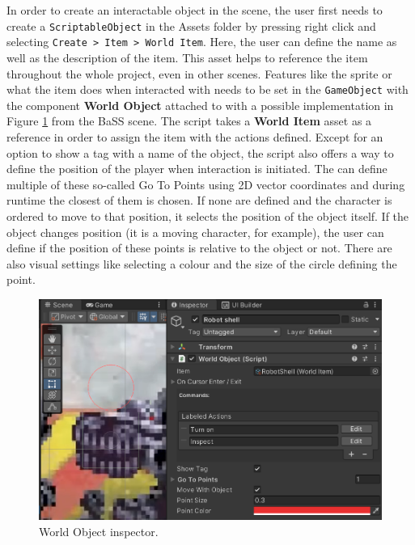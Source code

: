 In order to create an interactable object in the scene, the user first needs to create a \verb|ScriptableObject| in the Assets folder by pressing right click and selecting \verb|Create > Item > World Item|. Here, the user can define the name as well as the description of the item. This asset helps to reference the item throughout the whole project, even in other scenes. Features like the sprite or what the item does when interacted with needs to be set in the \verb|GameObject| with the component \textbf{World Object} attached to with a possible implementation in Figure \ref{fig:Manual-WO} from the BaSS scene. The script takes a \textbf{World Item} asset as a reference in order to assign the item with the actions defined. Except for an option to show a tag with a name of the object, the script also offers a way to define the position of the player when interaction is initiated. The can define multiple of these so-called Go To Points using 2D vector coordinates and during runtime the closest of them is chosen. If none are defined and the character is ordered to move to that position, it selects the position of the object itself. If the object changes position (it is a moving character, for example), the user can define if the position of these points is relative to the object or not. There are also visual settings like selecting a colour and the size of the circle defining the point.
\begin{figure}[H]
\centering
\includegraphics[width=.8\linewidth]{img/User doc/world_object.png}
\caption{World Object inspector.}
\label{fig:Manual-WO}
\end{figure}


